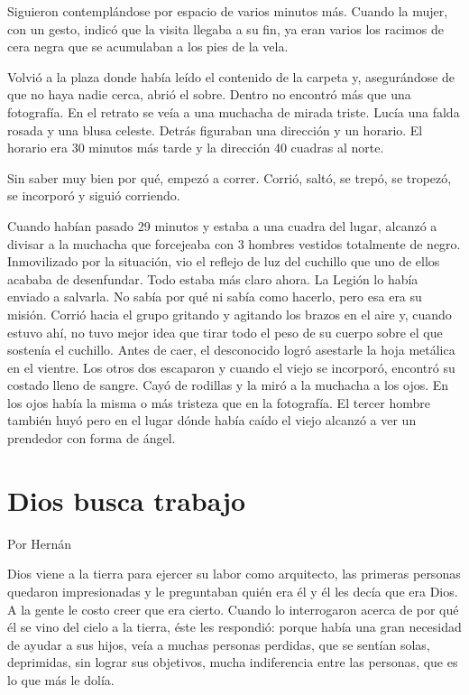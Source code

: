 \documentclass[11pt,twoside,openright,a5paper]{book}
\begin{document}
Siguieron contemplándose por espacio de varios minutos más. Cuando la mujer, con un gesto, indicó que la visita llegaba a su fin, ya eran varios los racimos de cera negra que se acumulaban a los pies de la vela.

Volvió a la plaza donde había leído el contenido de la carpeta y, asegurándose de que no haya nadie cerca, abrió el sobre. Dentro no encontró más que una fotografía. En el retrato se veía a una muchacha de mirada triste. Lucía una falda rosada y una blusa celeste. Detrás figuraban una dirección y un horario. El horario era 30 minutos más tarde y la dirección 40 cuadras al norte.

Sin saber muy bien por qué, empezó a correr. Corrió, saltó, se trepó, se tropezó, se incorporó y siguió corriendo.

Cuando habían pasado 29 minutos y estaba a una cuadra del lugar, alcanzó a divisar a la muchacha que forcejeaba con 3 hombres vestidos totalmente de negro. Inmovilizado por la situación, vio el reflejo de luz del cuchillo que uno de ellos acababa de desenfundar. Todo estaba más claro ahora. La Legión lo había enviado a salvarla. No sabía por qué ni sabía como hacerlo, pero esa era su misión. Corrió hacia el grupo gritando y agitando los brazos en el aire y, cuando estuvo ahí, no tuvo mejor idea que tirar todo el peso de su cuerpo sobre el que sostenía el cuchillo. Antes de caer, el desconocido logró asestarle la hoja metálica en el vientre. Los otros dos escaparon y cuando el viejo se incorporó, encontró su costado lleno de sangre. Cayó de rodillas y la miró a la muchacha a los ojos. En los ojos había la misma o más tristeza que en la fotografía. El tercer hombre también huyó pero en el lugar dónde había caído el viejo alcanzó a ver un prendedor con forma de ángel.   

\section*{Dios busca trabajo}

                                                                                          \begin{flushright}Por Hernán\end{flushright}

Dios viene a la tierra para ejercer su labor como arquitecto, las primeras personas quedaron impresionadas y le preguntaban quién era él y él les decía que era Dios. A la gente le costo creer que era cierto. Cuando lo interrogaron acerca de por qué él se vino del cielo a la tierra, éste les respondió: porque había una gran necesidad de ayudar a sus hijos, veía a muchas personas perdidas, que se sentían solas, deprimidas, sin lograr sus objetivos, mucha indiferencia entre las personas, que es lo que más le dolía.
\end{document}
